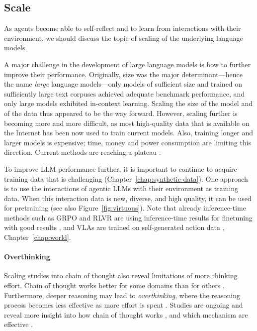 \subsection{Scale}
As agents become able to self-reflect and to learn from interactions with their environment, we should discuss the topic of scaling of the underlying language models.

A major challenge in the development of large language models is how to further improve their performance. Originally, size was the major determinant---hence the name {\em large} language models---only models of sufficient size and trained on sufficiently large text corpuses achieved adequate benchmark performance, and only large models exhibited in-context learning.  Scaling the size of the model and of the data thus appeared to be the way forward. However, scaling further is becoming more and more difficult, as most high-quality data that is available on the Internet has been now used to train current models. Also, training longer and larger models is expensive; time, money and power consumption are limiting this direction. Current methods are reaching a plateau \citep{sutskever2024}.

To improve LLM performance further, it is important to continue to acquire  training
data that is  challenging (Chapter~\ref{chap:synthetic-data}). One approach is to use the interactions of agentic LLMs with their environment as training data. When this interaction data is new, diverse, and high quality, it can be used for pretraining (see also Figure~\ref{fig:virtuous}). Note that already inference-time methods such as GRPO and RLVR are using inference-time results for finetuning with good results \citep{guo2025deepseek}, and VLAs are  trained on self-generated action data \citep{black2024pi_0,brohan2023rt}, Chapter~\ref{chap:world}. 

\paragraph{Overthinking}
Scaling studies into chain of thought also reveal limitations of more thinking effort. Chain of thought works better for some domains than for others \citep{sprague2024cot}. Furthermore, deeper reasoning may lead to {\em overthinking}, where the reasoning process becomes less effective as more effort is spent \citep{liu2024mind,wu2025more}. Studies are ongoing and reveal more insight into how chain of thought works \citep{chen2025does}, and which mechanism are effective \citep{chen2026think}.

